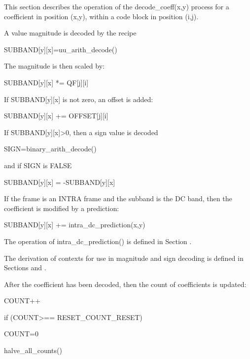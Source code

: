 This section describes the operation of the decode\_coeff(x,y) process
for a coefficient in position (x,y), within a code block in position
(i,j).

A value magnitude is decoded by the recipe

SUBBAND[y][x]=uu\_arith\_decode()

The magnitude is then scaled by:

SUBBAND[y][x] *= QF[j][i]

If SUBBAND[y][x] is not zero, an offset is added:

SUBBAND[y][x] += OFFSET[j][i]

If SUBBAND[y][x]>0, then a sign value is decoded

SIGN=binary\_arith\_decode()

and if SIGN is FALSE

SUBBAND[y][x] = -SUBBAND[y][x]

If the frame is an INTRA frame and the subband is the DC band, then the
coefficient is modified by a prediction:

SUBBAND[y][x] += intra\_dc\_prediction(x,y)

The operation of intra\_dc\_prediction() is defined in Section . 

The derivation of contexts for use in magnitude and sign decoding is
defined in Sections  and .

After the coefficient has been decoded, then the count of coefficients
is updated:

COUNT++

if (COUNT>== RESET\_COUNT\_RESET)

{

    COUNT=0

    halve\_all\_counts()

}


